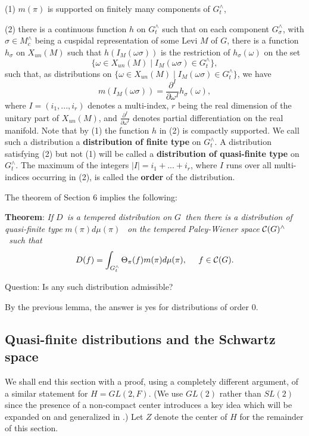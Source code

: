 \documentclass[11pt, a4paper]{article}
\begin{document}
(1) $m(\pi )$ is supported on finitely many components of $G_t^{\wedge }$,

(2) there is a continuous function $h$ on $G_t^{\wedge }$ such that on each
component $G_\sigma ^{\wedge }$, with $\sigma \in M_c^{\wedge }$ being a
cuspidal representation of some Levi $M$ of $G$, there is a function $%
h_\sigma $ on $X_{un}(M)$ such that $h(I_M(\omega \sigma ))$ is the
restriction of $h_\sigma (\omega )$ on the set
\[
\{\omega \in X_{un}(M)\;|\;I_M(\omega \sigma )\in G_t^{\wedge }\},
\]
such that, as distributions on $\{\omega \in X_{un}(M)\;|\;I_M(\omega \sigma
)\in G_t^{\wedge }\}$, we have
\[
m(I_M(\omega \sigma ))=\frac{\partial ^I}{\partial \omega ^I}h_\sigma
(\omega ),
\]
where $I=(i_1,...,i_r)$ denotes a multi-index, $r$ being the real dimension
of the unitary part of $X_{un}(M)$, and $\frac{\partial ^I}{\partial \omega ^I}$ denotes partial
differentiation on the real manifold. Note that by (1) the
function $h$ in (2) is compactly supported. We call such a distribution a 
{\bf distribution of finite type} on $G_t^{\wedge }$. A distribution
satisfying (2) but not (1) will be called a {\bf distribution of
quasi-finite type} on $G_t^{\wedge }$. The maximum of the integers $%
|I|=i_1+...+i_r$, where $I$ runs over all multi-indices occurring in (2), is
called the {\bf order} of the distribution.

The theorem of Section 6 implies the following:

{\bf Theorem}: {\em If }$D${\em \ is a tempered distribution on }$G${\em \
then there is a distribution of quasi-finite type }$m(\pi )d\mu (\pi )${\em %
\ on the tempered Paley-Wiener space }${\cal C}(G)^{\wedge }${\em \ such that%
}
\[
D(f)=\int_{G_t^{\wedge }}\Theta _\pi (f)m(\pi )d\mu (\pi ),\;\;\;\;\;f\in 
{\cal C}(G).
\]

{\sc Question}: Is any such distribution admissible?

By the previous lemma, the answer is yes for distributions of order $0$.

\subsection{Quasi-finite distributions and the Schwartz space}

We shall end this section with a proof, using a completely different
argument, of a similar statement for $H=GL(2,F)$. (We use $GL(2)$ rather
than $SL(2)$ since the presence of a non-compact center introduces a key
idea which will be expanded on and generalized in \cite{J}.) Let $Z$ denote the
center of $H$ for the remainder of this section.
\end{document}
